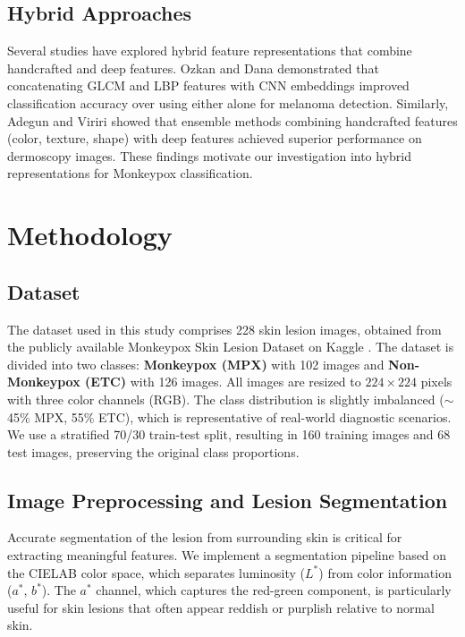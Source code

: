 \documentclass[conference]{IEEEtran}
\begin{document}
\subsection{Hybrid Approaches}

Several studies have explored hybrid feature representations that
combine handcrafted and deep features. Ozkan and Dana
\cite{ozkan2021deep} demonstrated that concatenating GLCM and LBP
features with CNN embeddings improved classification accuracy over
using either alone for melanoma detection. Similarly, Adegun and
Viriri \cite{adegun2021deep} showed that ensemble methods combining
handcrafted features (color, texture, shape) with deep features
achieved superior performance on dermoscopy images. These findings
motivate our investigation into hybrid representations for
Monkeypox classification.

\section{Methodology}
\label{sec:method}

\subsection{Dataset}

The dataset used in this study comprises 228 skin lesion images,
obtained from the publicly available Monkeypox Skin Lesion Dataset
on Kaggle \cite{kaggle_mpx}. The
dataset is divided into two classes: \textbf{Monkeypox (MPX)} with
102 images and \textbf{Non-Monkeypox (ETC)} with 126 images. All
images are resized to $224 \times 224$ pixels with three color
channels (RGB). The class distribution is slightly imbalanced ($\sim$
45\% MPX, 55\% ETC), which is representative of real-world
diagnostic scenarios. We use a stratified 70/30 train-test split,
resulting in 160 training images and 68 test images, preserving the
original class proportions.

\subsection{Image Preprocessing and Lesion Segmentation}

Accurate segmentation of the lesion from surrounding skin is critical
for extracting meaningful features. We implement a segmentation
pipeline based on the CIELAB color space, which separates luminosity
($L^*$) from color information ($a^*$, $b^*$). The $a^*$ channel,
which captures the red-green component, is particularly useful for
skin lesions that often appear reddish or purplish relative to
normal skin.
\end{document}

